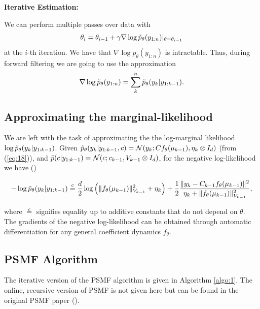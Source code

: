 \documentclass{mldsmsc}
\begin{document}
\noindent \textbf{Iterative Estimation:} \newline

\noindent We can perform multiple passes over data with 
\begin{equation}
    \theta_i = \theta_{i-1} + \gamma \nabla \log \Tilde{p}_{\theta}(y_{1:n}) \vert_{\theta = \theta_{i-1}}
\end{equation}
at the $i$-th iteration. We have that $\nabla \log p_{\theta}(y_{1:n})$ is intractable. Thus, during forward filtering we are going to use the approximation
\begin{equation}
    \nabla \log \Tilde{p}_{\theta}(y_{1:n}) = \sum_k^n \Tilde{p}_{\theta}(y_k | y_{1:k-1}).
\end{equation}

\subsection{Approximating the marginal-likelihood}

We are left with the task of approximating the the log-marginal likelihood $\log \Tilde{p}_{\theta}(y_k | y_{1:k-1})$. Given $\Tilde{p}_{\theta}(y_k | y_{1:k-1}, c) = \mathcal{N}(y_k; C f_{\theta}(\mu_{k-1}), \eta_k \otimes I_d)$ (from (\ref{eq:18})), and $\Tilde{p}(c | y_{1:k-1}) = \mathcal{N}(c; c_{k-1}, V_{k-1} \otimes I_d)$, for the negative log-likelihood we have (\cite{akyildiz2021probabilistic})

\begin{equation}
    -\log \Tilde{p}_{\theta}(y_k | y_{1:k-1}) \overset{c}{=} \frac{d}{2} \log \left(\Vert f_{\theta}(\mu_{k-1}) \Vert_{V_{k-1}}^2 + \eta_k\right) + \frac{1}{2} \frac{\Vert y_k - C_{k-1} f_{\theta}(\mu_{k-1}) \Vert^2}{\eta_k + \Vert f_{\theta}(\mu_{k-1}) \Vert^2_{V_{k-1}}},
\end{equation}

\noindent where $\overset{c}{=}$ signifies equality up to additive constants that do not depend on $\theta$. The gradients of the negative log-likelihood can be obtained through automatic differentiation for any general coefficient dynamics $f_{\theta}$.

\subsection{PSMF Algorithm}

The iterative version of the PSMF algorithm is given in Algorithm \ref{algo:1}. The online, recursive version of PSMF is not given here but can be found in the original PSMF paper (\cite{akyildiz2021probabilistic}).
\end{document}
